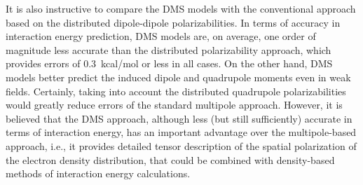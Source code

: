 \documentclass[aip,amsmath,amssymb,reprint,floatfix]{revtex4-1}
\begin{document}
It is also instructive to compare the DMS models with the conventional approach based on the distributed
dipole\hyp{}dipole
polarizabilities. In terms of accuracy in interaction energy prediction, DMS models are, on average, one order 
of magnitude less accurate than the distributed polarizability approach, which provides errors of 0.3~kcal/mol
or less in all cases. On the other hand, DMS models better predict the induced dipole and quadrupole 
moments even in weak fields. Certainly, taking into account the distributed quadrupole polarizabilities
would greatly reduce errors of the standard multipole approach. However, it is believed that
the DMS approach, although less (but still sufficiently) accurate in terms of interaction energy, 
has an important advantage over the multipole\hyp{}based approach, i.e., it provides detailed
tensor description of the spatial polarization of the electron density distribution, that could be
combined with density\hyp{}based methods of interaction energy calculations.\cite{Mandado.Hermida-Ramon.JCTC.2011}
\end{document}
